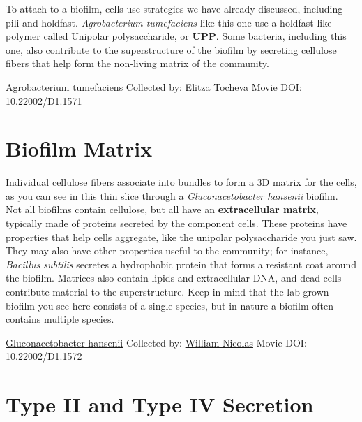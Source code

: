 \documentclass[]{tufte-book}
\begin{document}
To attach to a biofilm, cells use strategies we have already discussed, including pili and holdfast. \emph{Agrobacterium tumefaciens} like this one use a holdfast-like polymer called Unipolar polysaccharide, or \textbf{UPP}. Some bacteria, including this one, also contribute to the superstructure of the biofilm by secreting cellulose fibers that help form the non-living matrix of the community.



\hypertarget{htmlwidget-5aec6b54d3f204e6d0a9}{}

\label{fig:9-1}\protect\hyperlink{tree}{Agrobacterium tumefaciens} Collected by: \protect\hyperlink{elitza_tocheva}{Elitza Tocheva} Movie DOI: \href{https://doi.org/10.22002/D1.1571}{10.22002/D1.1571}

\hypertarget{biofilm-matrix}{%
\section{Biofilm Matrix}\label{biofilm-matrix}}

Individual cellulose fibers associate into bundles to form a 3D matrix for the cells, as you can see in this thin slice through a \emph{Gluconacetobacter hansenii} biofilm. Not all biofilms contain cellulose, but all have an \textbf{extracellular matrix}, typically made of proteins secreted by the component cells. These proteins have properties that help cells aggregate, like the unipolar polysaccharide you just saw. They may also have other properties useful to the community; for instance, \emph{Bacillus subtilis} secretes a hydrophobic protein that forms a resistant coat around the biofilm. Matrices also contain lipids and extracellular DNA, and dead cells contribute material to the superstructure. Keep in mind that the lab-grown biofilm you see here consists of a single species, but in nature a biofilm often contains multiple species.



\hypertarget{htmlwidget-afe39cf159e2233349c0}{}

\label{fig:9-2}\protect\hyperlink{tree}{Gluconacetobacter hansenii} Collected by: \protect\hyperlink{william_nicolas}{William Nicolas} Movie DOI: \href{https://doi.org/10.22002/D1.1572}{10.22002/D1.1572}

\hypertarget{type-ii-and-type-iv-secretion}{%
\section{Type II and Type IV Secretion}\label{type-ii-and-type-iv-secretion}}
\end{document}
